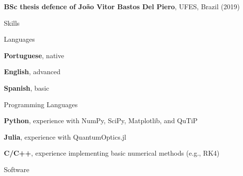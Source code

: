 \documentclass[11pt]{article}
\renewcommand{\Large}{\fontsize{14}{16}\selectfont}
\renewcommand{\large}{\fontsize{12}{14}\selectfont}
\newcommand{\MySection}[1]{
    \vspace*{2em}
    {\color{Indigo} \Large \textsf{\uppercase{#1}} \hrulefill} \par
    \vspace*{1em}
}
\newcommand{\MySubSec}[1]{
    \vspace*{0.25em}
    {\color{Indigo} \large \textsf{#1}} \par
    \vspace*{0.25em}
}
\newcommand{\ActivItem}[3]{
    {\small
    \quad \textbf{#1}, #2 \par
    \quad #3} \par
}
\newcommand{\SkillItem}[2]{
    {\small
    \quad \textbf{#1}, #2 \par
    }
}
\begin{document}
\ActivItem{BSc thesis defence of João Vitor Bastos Del Piero}
{UFES, Brazil (2019)}

\MySection{Skills}

\begin{minipage}[t]{0.33\linewidth}
    \MySubSec{Languages}

    \SkillItem{Portuguese}{native}

    \SkillItem{English}{advanced}

    \SkillItem{Spanish}{basic}
\end{minipage}
\begin{minipage}[t]{0.66\linewidth}
    \MySubSec{Programming Languages}

    \SkillItem{Python}
    {experience with NumPy, SciPy, Matplotlib, and QuTiP}

    \SkillItem{Julia}
    {experience with QuantumOptics.jl}

    \SkillItem{C/C++}
    {experience implementing basic numerical methods (e.g., RK4)}

    \MySubSec{Software}


    \quad {\small \textbf{\LaTeX}}
\end{minipage}
\end{document}

